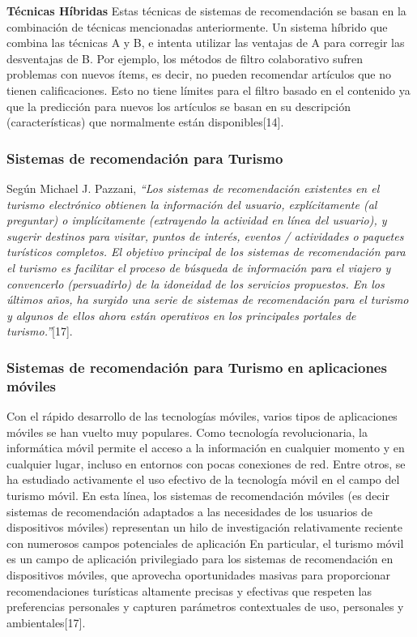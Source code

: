 \documentclass[12pt,letterpaper,openany]{book}
\begin{document}
\vspace{5mm}\newline
\textbf{Técnicas Híbridas}\newline
Estas técnicas de sistemas de recomendación se basan en la combinación de técnicas mencionadas anteriormente. Un sistema híbrido que combina las técnicas A y B, e intenta utilizar las ventajas de A para corregir las desventajas de B. Por ejemplo, los métodos de filtro colaborativo sufren problemas con nuevos ítems, es decir, no pueden recomendar artículos que no tienen calificaciones. Esto no tiene límites para el filtro basado en el contenido ya que la predicción para nuevos los artículos se basan en su descripción (características) que normalmente están disponibles[14]. 

\subsubsection{Sistemas de recomendación para Turismo}
Según Michael J. Pazzani, \textit{“Los sistemas de recomendación existentes en el turismo electrónico obtienen la información del usuario, explícitamente (al preguntar) o implícitamente (extrayendo la actividad en línea del usuario), y sugerir destinos para visitar, puntos de interés, eventos / actividades o paquetes turísticos completos. El objetivo principal de los sistemas de recomendación para el turismo es facilitar el proceso de búsqueda de información para el viajero y convencerlo (persuadirlo) de la idoneidad de los servicios propuestos. En los últimos años, ha surgido una serie de sistemas de recomendación para el turismo y algunos de ellos ahora están operativos en los principales portales de turismo.”}[17]. 

\subsubsection{Sistemas de recomendación para Turismo en aplicaciones móviles}
Con el rápido desarrollo de las tecnologías móviles, varios tipos de aplicaciones móviles se han vuelto muy populares. Como tecnología revolucionaria, la informática móvil permite el acceso a la información en cualquier momento y en cualquier lugar, incluso en entornos con pocas conexiones de red. Entre otros, se ha estudiado activamente el uso efectivo de la tecnología móvil en el campo del turismo móvil. En esta línea, los sistemas de recomendación móviles (es decir sistemas de recomendación adaptados a las necesidades de los usuarios de dispositivos móviles) representan un hilo de investigación relativamente reciente con numerosos campos potenciales de aplicación  En particular, el turismo móvil es un campo de aplicación privilegiado para los sistemas de recomendación en dispositivos móviles, que aprovecha oportunidades masivas para proporcionar recomendaciones turísticas altamente precisas y efectivas que respeten las preferencias personales y capturen parámetros contextuales de uso, personales y ambientales[17]. 
\end{document}
